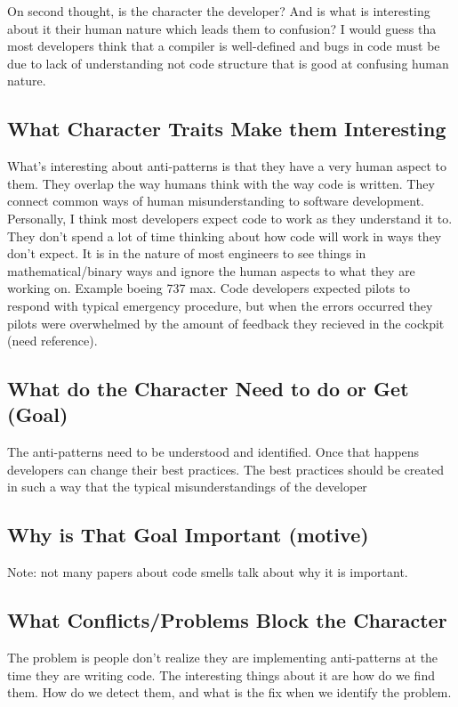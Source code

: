 \documentclass[conference]{IEEEtran}
\begin{document}
On second thought, is the character the developer? 
And is what is interesting about it their human nature which leads them to confusion?
I would guess tha most developers think that a compiler is well-defined and bugs in code must be due to lack of understanding not code structure that is good at confusing human nature.
\subsection{What Character Traits Make them Interesting}
What's interesting about anti-patterns is that they have a very human aspect to them. 
They overlap the way humans think with the way code is written. 
They connect common ways of human misunderstanding to software development. 
Personally, I think most developers expect code to work as they understand it to. 
They don't spend a lot of time thinking about how code will work in ways they don't expect.
It is in the nature of most engineers to see things in mathematical/binary ways and ignore the human aspects to what they are working on.
Example boeing 737 max.
Code developers expected pilots to respond with typical emergency procedure, but when the errors occurred they pilots were overwhelmed by the amount of feedback they recieved in the cockpit (need reference).

\subsection{What do the Character Need to do or Get (Goal)}
The anti-patterns need to be understood and identified.
Once that happens developers can change their best practices.
The best practices should be created in such a way that the typical misunderstandings of the developer

\subsection{Why is That Goal Important (motive)}
Note: not many papers about code smells talk about why it is important.

\subsection{What Conflicts/Problems Block the Character}

The problem is people don't realize they are implementing anti-patterns at the time they are writing code.
The interesting things about it are how do we find them. 
How do we detect them, and what is the fix when we identify the problem.
\end{document}
